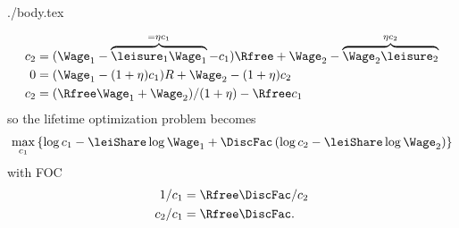\documentclass{handout}
\begin{document}
\begin{verbatimwrite}{./body.tex}
{  \begin{equation}\begin{gathered}\begin{aligned}
   c_{2} & =  (\Wage_{1}-\overbrace{\leisure_{1}\Wage_{1}}^{=\eta c_{1}}-c_{1})\Rfree + \Wage_{2} - \overbrace{\Wage_{2}\leisure_{2}}^{\eta c_{2}}
\\     0  & =  (\Wage_{1}-(1+\eta) c_{1})R+\Wage_{2}-(1+\eta) c_{2}
\\ c_{2} & =  (\Rfree \Wage_{1}+\Wage_{2})/(1+\eta)- \Rfree c_{1}
  \end{aligned}\end{gathered}\end{equation}
so the lifetime optimization problem becomes
  \begin{equation}\begin{gathered}\begin{aligned}
    \max_{c_{1}} \left\{\log c_{1}-\leiShare \log \Wage_{1} + \DiscFac \left(\log c_{2} - \leiShare \log  \Wage_{2} \right)\right\}
  \end{aligned}\end{gathered}\end{equation}
with FOC
\begin{equation}\begin{gathered}\begin{aligned}
  1/c_{1} & =  \Rfree \DiscFac / c_{2}
\\ c_{2}/c_{1} & =  \Rfree\DiscFac
.
\end{aligned}\end{gathered}\end{equation}

}{}




\end{verbatimwrite}
\end{document}
